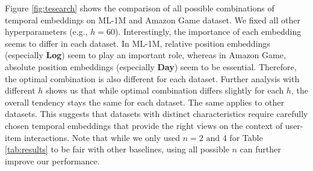 Figure \ref{fig:tesearch} shows the comparison of all possible combinations of temporal embeddings on ML-1M and Amazon Game dataset. We fixed all other hyperparameters (e.g., $h=60$). Interestingly, the importance of each embedding seems to differ in each dataset. In ML-1M, relative position embeddings (especially \textbf{Log}) seem to play an important role, whereas in Amazon Game, absolute position embeddings (especially \textbf{Day}) seem to be essential. Therefore, the optimal combination is also different for each dataset. Further analysis with different $h$ shows us that while optimal combination differs slightly for each $h$, the overall tendency stays the same for each dataset. The same applies to other datasets. This suggests that datasets with distinct characteristics require carefully chosen temporal embeddings that provide the right views on the context of user-item interactions. Note that while we only used $n=2\text{ and }4$ for Table \ref{tab:results} to be fair with other baselines, using all possible $n$ can further improve our performance.


% 


